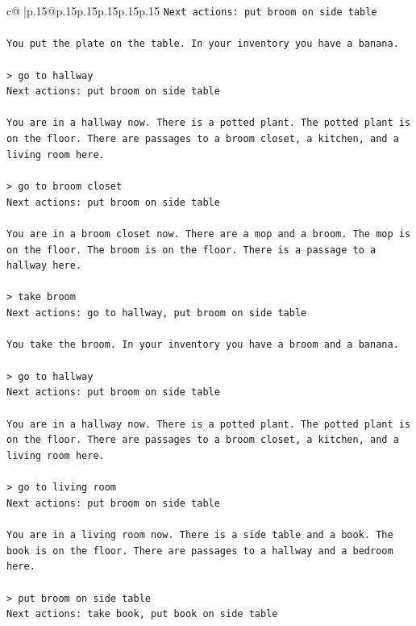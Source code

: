 \documentclass{article}
\begin{document}
{\begin{supertabular}{c@{$\;$}|p{.15\linewidth}@{}p{.15\linewidth}p{.15\linewidth}p{.15\linewidth}p{.15\linewidth}p{.15\linewidth}}
{{{\texttt{Next actions: put broom on side table} \\
\\ 
\texttt{You put the plate on the table. In your inventory you have a banana.} \\
\\ 
\texttt{> go to hallway  } \\
\texttt{Next actions: put broom on side table} \\
\\ 
\texttt{You are in a hallway now. There is a potted plant. The potted plant is on the floor. There are passages to a broom closet, a kitchen, and a living room here.} \\
\\ 
\texttt{> go to broom closet  } \\
\texttt{Next actions: put broom on side table} \\
\\ 
\texttt{You are in a broom closet now. There are a mop and a broom. The mop is on the floor. The broom is on the floor. There is a passage to a hallway here.} \\
\\ 
\texttt{> take broom  } \\
\texttt{Next actions: go to hallway, put broom on side table} \\
\\ 
\texttt{You take the broom. In your inventory you have a broom and a banana.} \\
\\ 
\texttt{> go to hallway  } \\
\texttt{Next actions: put broom on side table} \\
\\ 
\texttt{You are in a hallway now. There is a potted plant. The potted plant is on the floor. There are passages to a broom closet, a kitchen, and a living room here.} \\
\\ 
\texttt{> go to living room  } \\
\texttt{Next actions: put broom on side table} \\
\\ 
\texttt{You are in a living room now. There is a side table and a book. The book is on the floor. There are passages to a hallway and a bedroom here.} \\
\\ 
\texttt{> put broom on side table  } \\
\texttt{Next actions: take book, put book on side table} \\
}}}
\end{supertabular}}
\end{document}

